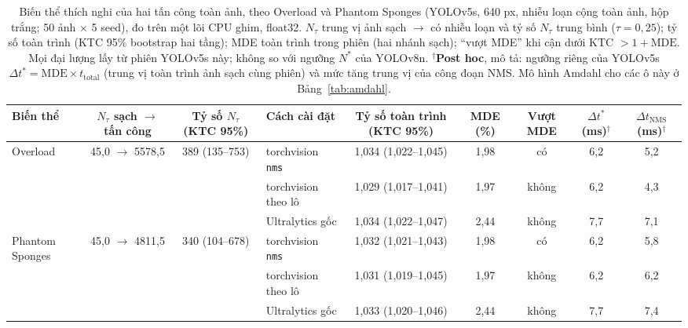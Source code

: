 \documentclass[a4paper,fleqn]{cas-dc}
\newcommand{\Ntau}{N_{\tau}}
\begin{document}
\begin{table}[!tp]
\centering\small
\caption{Biến thể thích nghi của hai tấn công toàn ảnh, theo Overload và Phantom Sponges (YOLOv5s, 640 px, nhiễu loạn cộng toàn ảnh, hộp trắng; 50 ảnh $\times$ 5 seed), đo trên một lõi CPU ghim, float32. $\Ntau$ trung vị ảnh sạch $\to$ có nhiễu loạn và tỷ số $\Ntau$ trung bình ($\tau=0{,}25$); tỷ số toàn trình (KTC 95\% bootstrap hai tầng); MDE toàn trình trong phiên (hai nhánh sạch); ``vượt MDE'' khi cận dưới KTC $>1+\mathrm{MDE}$. Mọi đại lượng lấy từ phiên YOLOv5s này; không so với ngưỡng $N^{*}$ của YOLOv8n. $^{\dagger}$\textbf{Post hoc}, mô tả: ngưỡng riêng của YOLOv5s $\Delta t^{*}=\mathrm{MDE}\times t_{\mathrm{total}}$ (trung vị toàn trình ảnh sạch cùng phiên) và mức tăng trung vị của công đoạn NMS. Mô hình Amdahl cho các ô này ở Bảng~\ref{tab:amdahl}.}
\label{tab:attacks}
\begin{adjustbox}{max width=\textwidth}
\begin{tabular}{@{}lcclccccc@{}}
\toprule
Biến thể & $\Ntau$ sạch $\to$ tấn công & Tỷ số $\Ntau$ (KTC 95\%) & Cách cài đặt & Tỷ số toàn trình (KTC 95\%) & MDE (\%) & Vượt MDE & $\Delta t^{*}$ (ms)$^{\dagger}$ & $\Delta t_{\mathrm{NMS}}$ (ms)$^{\dagger}$ \\
\midrule
Overload & 45,0 $\to$ 5578,5 & 389 (135--753) & torchvision \texttt{nms} & 1,034 (1,022--1,045) & 1,98 & có & 6,2 & 5,2 \\
 & &  & torchvision theo lô & 1,029 (1,017--1,041) & 1,97 & không & 6,2 & 4,3 \\
 & &  & Ultralytics gốc & 1,034 (1,022--1,047) & 2,44 & không & 7,7 & 7,1 \\
Phantom Sponges & 45,0 $\to$ 4811,5 & 340 (104--678) & torchvision \texttt{nms} & 1,032 (1,021--1,043) & 1,98 & có & 6,2 & 5,8 \\
 & &  & torchvision theo lô & 1,031 (1,019--1,045) & 1,97 & không & 6,2 & 6,2 \\
 & &  & Ultralytics gốc & 1,033 (1,020--1,046) & 2,44 & không & 7,7 & 7,4 \\
\bottomrule
\end{tabular}
\end{adjustbox}
\end{table}
\end{document}

